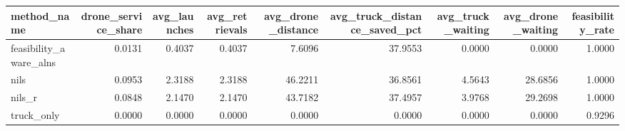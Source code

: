 \begin{tabular}{lrrrrrrrr}
\toprule
method_name & drone_service_share & avg_launches & avg_retrievals & avg_drone_distance & avg_truck_distance_saved_pct & avg_truck_waiting & avg_drone_waiting & feasibility_rate \\
\midrule
feasibility_aware_alns & 0.0131 & 0.4037 & 0.4037 & 7.6096 & 37.9553 & 0.0000 & 0.0000 & 1.0000 \\
nils & 0.0953 & 2.3188 & 2.3188 & 46.2211 & 36.8561 & 4.5643 & 28.6856 & 1.0000 \\
nils_r & 0.0848 & 2.1470 & 2.1470 & 43.7182 & 37.4957 & 3.9768 & 29.2698 & 1.0000 \\
truck_only & 0.0000 & 0.0000 & 0.0000 & 0.0000 & 0.0000 & 0.0000 & 0.0000 & 0.9296 \\
\bottomrule
\end{tabular}
